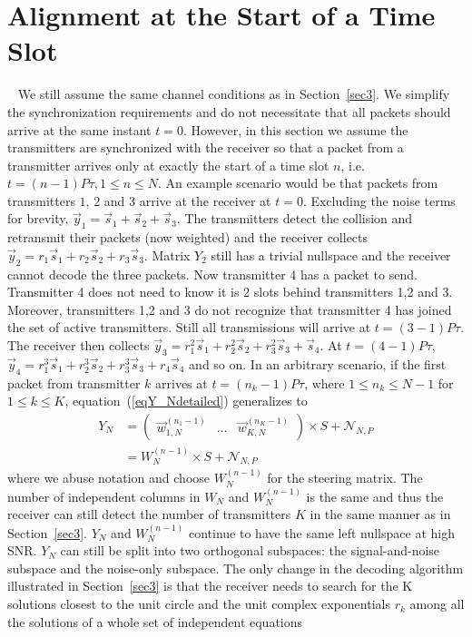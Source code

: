 \documentclass[10pt, a4paper, twocolumn]{IEEEtran}
\begin{document}
\section{Alignment at the Start of a Time Slot}~\label{sec4}
We still assume the same channel conditions as in Section~\ref{sec3}. We simplify the synchronization requirements and do not necessitate that all packets should arrive at the same instant $t=0$. However, in this section we assume the transmitters are synchronized with the receiver so that a packet from a transmitter arrives only at exactly the start of a time slot $n$, i.e. $t = (n-1)P\tau, 1\leq n\leq N$. An example scenario would be that packets from transmitters $1$, $2$ and $3$ arrive at the receiver at $t=0$. Excluding the noise terms for brevity, $\overrightarrow{y}_1 =  \overrightarrow{s}_1 + \overrightarrow{s}_2 + \overrightarrow{s}_3$. The transmitters detect the collision and retransmit their packets (now weighted) and the receiver collects $\overrightarrow{y}_2 =  r_1\overrightarrow{s}_1 + r_2\overrightarrow{s}_2 + r_3\overrightarrow{s}_3$. Matrix $Y_2$ still has a trivial nullspace and the receiver cannot decode the three packets. Now transmitter 4 has a packet to send. Transmitter 4 does not need to know it is 2 slots behind transmitters 1,2 and 3. Moreover, transmitters 1,2 and 3 do not recognize that transmitter 4 has joined the set of active transmitters. Still all transmissions will arrive at $t=(3-1)P\tau$. The receiver then collects $\overrightarrow{y}_3 =  r_1^2\overrightarrow{s}_1 + r_2^2\overrightarrow{s}_2 + r_3^2\overrightarrow{s}_3 + \overrightarrow{s}_4$. At $t=(4-1)P\tau$, $\overrightarrow{y}_4 =  r_1^3\overrightarrow{s}_1 + r_2^3\overrightarrow{s}_2 + r_3^3\overrightarrow{s}_3 + r_4\overrightarrow{s}_4$ and so on. In an arbitrary scenario, if the first packet from transmitter $k$ arrives at $t =(n_k-1)P\tau$, where $1\leq n_k\leq N-1$ for $1\leq k\leq K$, equation~(\ref{eqY_Ndetailed}) generalizes to
\begin{equation}
\label{eqY_N2}
\begin{split}
Y_N &= \begin{pmatrix}
\overrightarrow{w}_{1,N}^{(n_1-1)} & \hdots & \overrightarrow{w}_{K,N}^{(n_K-1)}
\end{pmatrix} \times S + \mathcal{N}_{N,P}\\
&= W_N^{(n-1)}\times S + \mathcal{N}_{N,P}
\end{split}
\end{equation}
\noindent where we abuse notation and choose $W_N^{(n-1)}$ for the steering matrix. The number of independent columns in $W_N$ and $W_N^{(n-1)}$ is the same and thus the receiver can still detect the number of transmitters $K$ in the same manner as in Section~\ref{sec3}. $Y_N$ and $W_N^{(n-1)}$ continue to have the same left nullspace at high SNR. $Y_N$ can still be split into two orthogonal subspaces: the signal-and-noise subspace and the noise-only subspace. The only change in the decoding algorithm illustrated in Section~\ref{sec3} is that the receiver needs to search for the K solutions closest to the unit circle and the unit complex exponentials $r_k$ among all the solutions of a whole set of independent equations
\end{document}
